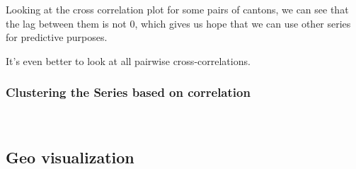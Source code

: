 \documentclass[11pt]{article}
\begin{document}
    
    Looking at the cross correlation plot for some pairs of cantons, we can
see that the lag between them is not \(0\), which gives us hope that we
can use other series for predictive purposes.

    
    
    It's even better to look at all pairwise cross-correlations.

    
    
    
    
    \hypertarget{clustering-the-series-based-on-correlation}{%
\subsubsection{Clustering the Series based on
correlation}\label{clustering-the-series-based-on-correlation}}

    \begin{center}
    \end{center}
    { \hspace*{\fill} \\}
    
    \hypertarget{geo-visualization}{%
\subsection{Geo visualization}\label{geo-visualization}}

    
    
    
    
    
    
\end{document}
